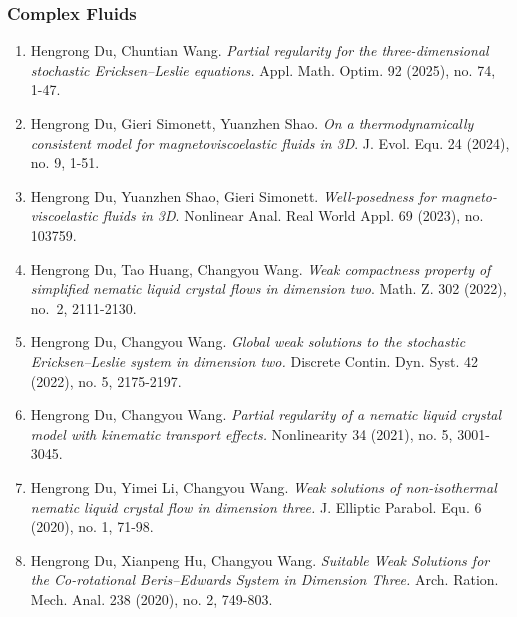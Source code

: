 \documentclass[12pt]{article}
\makeatletter
\newlength{\bibhang}
\newlength{\bibsep}
 {\@listi \global\bibsep\itemsep \global\advance\bibsep by\parsep}
\newenvironment{bibsection}%
        {\begin{enumerate}{}{%
       \setlength{\leftmargin}{\bibhang}%
       \setlength{\itemindent}{-\leftmargin}%
       \setlength{\itemsep}{\bibsep}%
       \setlength{\parsep}{\z@}%
        \setlength{\partopsep}{0pt}%
        \setlength{\topsep}{0pt}}}
        {\end{enumerate}\vspace{-.6\baselineskip}}
\makeatother
\begin{document}
\subsubsection*{\hspace{2in}Complex Fluids}
\begin{bibsection}

\setcounter{enumi}{7}
\item Hengrong Du, Chuntian Wang. \emph{Partial regularity for the three-dimensional stochastic Ericksen--Leslie equations.} Appl. Math. Optim. 92 (2025), no. 74, 1-47. 

\item Hengrong Du, Gieri Simonett, Yuanzhen Shao. \emph{On a thermodynamically consistent model for magnetoviscoelastic fluids in 3D}. J. Evol. Equ. 24 (2024), no. 9, 1-51. 



\item Hengrong Du, Yuanzhen Shao, Gieri Simonett. \emph{Well-posedness for magneto-viscoelastic fluids in 3D}. Nonlinear Anal. Real World Appl. 69 (2023), no. 103759.

\item Hengrong Du, Tao Huang, Changyou Wang. \emph{Weak compactness property of simplified nematic liquid crystal flows in dimension two}. Math. Z. 302  (2022), no.~2, 2111-2130.

\item Hengrong Du, Changyou Wang. \emph{Global weak solutions to the stochastic Ericksen–Leslie system in dimension two.}  Discrete Contin. Dyn. Syst. 42 (2022),  no. 5, 2175-2197.

\item Hengrong Du,  Changyou Wang. \emph{Partial regularity of a nematic liquid crystal model with kinematic transport effects. }Nonlinearity 34 (2021), no. 5, 3001-3045.

\item Hengrong Du, Yimei Li, Changyou Wang. \emph{Weak solutions of non-isothermal nematic liquid crystal flow in dimension three.} J. Elliptic Parabol. Equ. 6 (2020), no. 1, 71-98.

\item Hengrong Du, Xianpeng Hu, Changyou Wang. \emph{Suitable Weak Solutions for the Co-rotational Beris–Edwards System in Dimension Three.} Arch. Ration. Mech. Anal. 238 (2020), no. 2, 749-803.

\end{bibsection}
\end{document}
